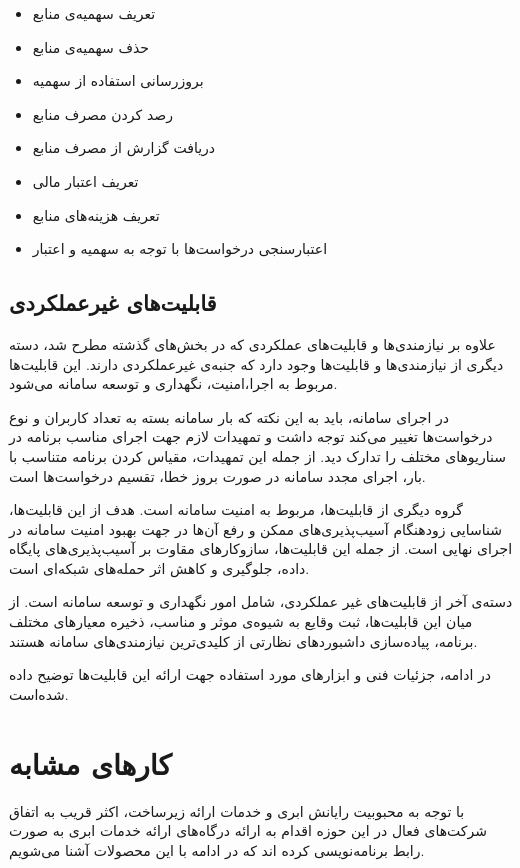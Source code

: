 \begin{itemize}
	\item تعریف سهمیه‌ی منابع
	\item حذف سهمیه‌ی منابع
	\item بروزرسانی استفاده از سهمیه
	\item رصد کردن مصرف منابع
	\item دریافت گزارش از مصرف منابع
	\item تعریف اعتبار مالی
	\item تعریف هزینه‌های منابع
	\item اعتبارسنجی درخواست‌ها با توجه به سهمیه و اعتبار
\end{itemize}

\subsection{قابلیت‌های غیرعملکردی}
علاوه بر نیازمندی‌ها و قابلیت‌های عملکردی که در بخش‌های گذشته مطرح شد، دسته دیگری از نیازمندی‌ها و قابلیت‌ها وجود دارد که جنبه‌ی غیرعملکردی دارند. این قابلیت‌ها مربوط به اجرا،امنیت، نگهداری و توسعه سامانه می‌شود.

در اجرای سامانه، باید به این نکته که بار سامانه بسته به تعداد کاربران و نوع درخواست‌ها تغییر می‌کند توجه داشت و تمهیدات لازم جهت اجرای مناسب برنامه در سناریو‌های مختلف را تدارک دید. از جمله این تمهیدات، مقیاس کردن برنامه متناسب با بار، اجرای مجدد سامانه در صورت بروز خطا، تقسیم درخواست‌ها است.

گروه دیگری از قابلیت‌ها، مربوط به امنیت سامانه است. هدف از این قابلیت‌ها، شناسایی زودهنگام آسیب‌پذیری‌های ممکن و رفع آن‌ها در جهت بهبود امنیت سامانه در اجرای نهایی است. از جمله این قابلیت‌ها، سازوکارهای مقاوت بر آسیب‌پذیری‌های پایگاه داده، جلوگیری و کاهش اثر حمله‌های شبکه‌ای است.

دسته‌ی آخر از قابلیت‌های غیر عملکردی، شامل امور نگهداری و توسعه سامانه است. از میان این قابلیت‌ها، ثبت وقایع به شیوه‌ی موثر و مناسب، ذخیره معیار‌های مختلف برنامه، پیاده‌سازی داشبوردهای نظارتی از کلیدی‌ترین نیازمندی‌‌های سامانه هستند.

در ادامه، جزئیات فنی و ابزار‌های مورد استفاده جهت ارائه این قابلیت‌ها توضیح داده شده‌است.


\section{کارهای مشابه}
با توجه به محبوبیت رایانش ابری و خدمات ارائه زیرساخت، اکثر قریب به اتفاق شرکت‌های فعال در این حوزه اقدام به ارائه درگاه‌های ارائه خدمات ابری به صورت رابط برنامه‌نویسی کرده اند که در ادامه با این محصولات آشنا می‌شویم.

